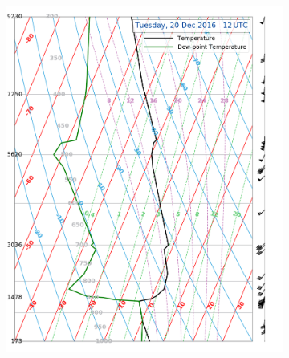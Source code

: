 \begin{landscape}
	\begin{figure}%
		\centering
		\begin{subfigure}[b]{0.66\textheight}
			\includegraphics[trim={0cm 0.2cm 2.5cm .5cm},clip,width=\textwidth]{./fig_Sounding/20161220_12Z}
			\caption{}\label{fig:Soun20}
		\end{subfigure}
		\quad
		\begin{subfigure}[b]{0.66\textheight}

\end{subfigure}
\end{figure}
\end{landscape}
